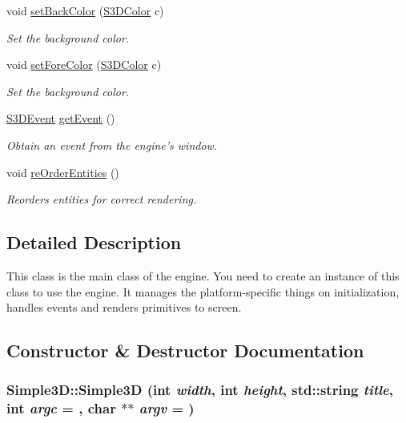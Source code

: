 \begin{DoxyCompactItemize}
$$void \hyperlink{class_simple3_d_a2e1f61afda5ab9cb2a1abd05a856c5d7}{setBackColor} (\hyperlink{struct_s3_d_color}{S3DColor} c)
\begin{DoxyCompactList}\small\item\em Set the background color. \item\end{DoxyCompactList}\item 
void \hyperlink{class_simple3_d_a9dd0eb5a220c4490656dc3dd5cc79857}{setForeColor} (\hyperlink{struct_s3_d_color}{S3DColor} c)
\begin{DoxyCompactList}\small\item\em Set the background color. \item\end{DoxyCompactList}\item 
\hyperlink{types_8h_aaff2e5237961055f6df00adbc5cf07ee}{S3DEvent} \hyperlink{class_simple3_d_a8f6621e3e0b4bfae3011514e7fc73003}{getEvent} ()
\begin{DoxyCompactList}\small\item\em Obtain an event from the engine's window. \item\end{DoxyCompactList}\item 
void \hyperlink{class_simple3_d_aa0da52599eafb396ec36e3d0cf6da504}{reOrderEntities} ()
\begin{DoxyCompactList}\small\item\em Reorders entities for correct rendering. \item\end{DoxyCompactList}\end{DoxyCompactItemize}


\subsection{Detailed Description}
This class is the main class of the engine. You need to create an instance of this class to use the engine. It manages the platform-\/specific things on initialization, handles events and renders primitives to screen. 

\subsection{Constructor \& Destructor Documentation}
\hypertarget{class_simple3_d_a7644ace43261dd71e7f3cb9c9659025d}{
\subsubsection[{Simple3D}]{\setlength{\rightskip}{0pt plus 5cm}Simple3D::Simple3D (int {\em width}, \/  int {\em height}, \/  std::string {\em title}, \/  int {\em argc} = {}, \/  char $\ast$$\ast$ {\em argv} = {})}}
\label{class_simple3_d_a7644ace43261dd71e7f3cb9c9659025d}


